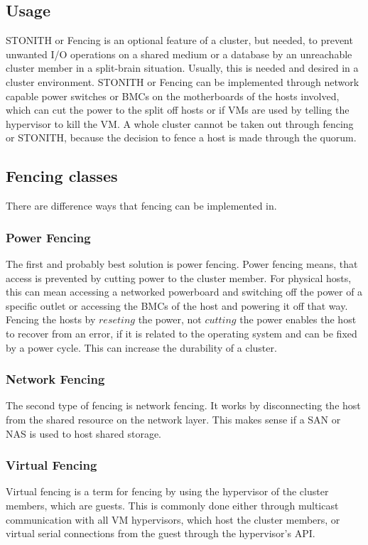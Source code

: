 \subsection{Usage}
STONITH or Fencing is an optional feature of a cluster, but needed,
to prevent unwanted I/O operations on a shared medium or a database
by an unreachable cluster member in a split-brain situation. Usually, this is needed
and desired in a cluster environment. STONITH or Fencing can be implemented
through network capable power switches or \acp{BMC} on the motherboards
of the hosts involved, which can cut the power to the split off hosts or
if \acp{VM} are used by telling the hypervisor to kill the \ac{VM}.
A whole cluster cannot be taken out through fencing or \ac{STONITH}, because
the decision to fence a host is made through the quorum.
\subsection{Fencing classes}
There are difference ways that fencing can be implemented in.
\subsubsection{Power Fencing}
The first and probably best solution is power fencing.
Power fencing means, that access is prevented by cutting power to the cluster member.
For physical hosts, this can mean accessing a networked powerboard and switching
off the power of a specific outlet or accessing the \acp{BMC} of the host
and powering it off that way. Fencing the hosts by $reseting$ the power, not $cutting$
the power enables the host to recover from an error, if it is related to the operating
system and can be fixed by a power cycle. This can increase the durability of a cluster.
\subsubsection{Network Fencing}
The second type of fencing is network fencing. It works by disconnecting the host
from the shared resource on the network layer. This makes sense if a \ac{SAN} or \ac{NAS}
is used to host shared storage.
\subsubsection{Virtual Fencing}
Virtual fencing is a term for fencing by using the hypervisor of the cluster members,
which are guests. This is commonly done either through multicast communication with all
\ac{VM} hypervisors, which host the cluster members, or virtual serial connections
from the guest through the hypervisor's \ac{API}.

